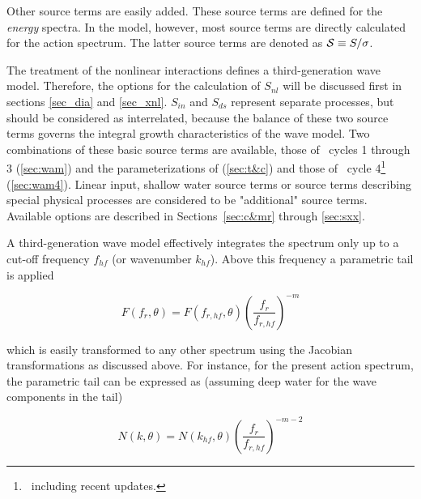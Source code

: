 \noindent
Other source terms are easily added. These source terms are defined for the
{\em energy} spectra. In the model, however, most source terms are directly
calculated for the action spectrum. The latter source terms are denoted as
${\cal S} \equiv S/\sigma$.

The treatment of the nonlinear interactions defines a third-generation wave
model. Therefore, the options for the calculation of $S_{nl}$ will be
discussed first in sections \ref{sec_dia} and \ref{sec_xnl}. $S_{in}$ and
$S_{ds}$ represent separate processes, but should be considered as
interrelated, because the balance of these two source terms governs the
integral growth characteristics of the wave model. Two combinations of these
basic source terms are available, those of \wam\ cycles 1 through 3
(\para\ref{sec:wam}) and the parameterizations of \cite{tol:JPO96}
(\para\ref{sec:t&c}) and those of \wam\ cycle 4\footnote{~including recent
updates.} (\para\ref{sec:wam4}). Linear input, shallow water source terms or
source terms describing special physical processes are considered to be
"additional" source terms. Available options are described in
Sections~\ref{sec:c&mr} through \ref{sec:sxx}.

\vspace{\baselineskip} \noindent
A third-generation wave model effectively integrates the spectrum only up to a
cut-off frequency $f_{hf}$ (or wavenumber $k_{hf}$). Above this frequency a
parametric tail is applied \citep[e.g.,][]{art:WAM88}


\begin{equation}
F(f_r,\theta) = F(f_{r,hf},\theta) \left ( \frac{f_r}{f_{r,hf}}
\right ) ^{-m} \label{eq:tail_E_f}
\end{equation}

\noindent
which is easily transformed to any other spectrum using the Jacobian
transformations as discussed above. For instance, for the present action
spectrum, the parametric tail can be expressed as (assuming deep water for the
wave components in the tail)


\begin{equation}
N(k,\theta) = N(k_{hf},\theta) \left ( \frac{f_r}{f_{r,hf}}
\right ) ^{-m-2} \label{eq:tail_N_k}
\end{equation}

